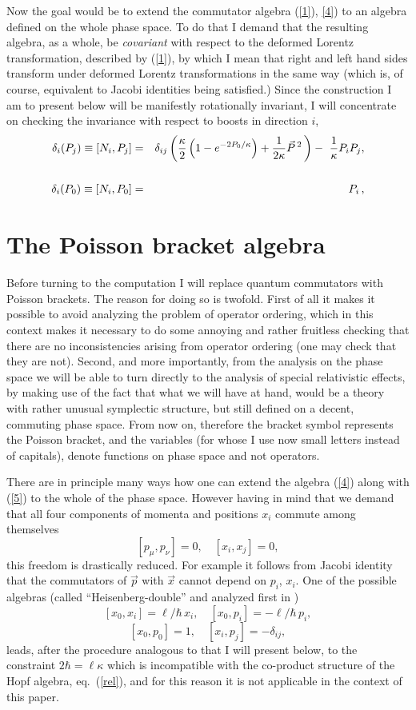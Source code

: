 \documentclass[a4paper,a4paper]{article}
\begin{document}
Now the  goal would be to extend the commutator algebra (\ref{1}), \ref{4}) to an algebra defined on the whole phase space. To do that I demand that the resulting algebra, as a whole,  be {\em covariant} with respect to the deformed Lorentz transformation, described by (\ref{1}), by which I mean that right and  left hand sides transform under deformed Lorentz transformations in the same way (which is, of course, equivalent to Jacobi identities being satisfied.) Since the construction I am to present below will be manifestly rotationally invariant, I will concentrate on checking the invariance with respect to boosts in direction $i$,
\begin{eqnarray} \label{5}
\displaystyle
\delta_i(P_j) \equiv  [N_{i}, P_{j}] = && \delta_{ij}
 \left( {\kappa\over 2} \left(
 1 -e^{-2{P_{0}/ \kappa}}
\right) + {1\over 2\kappa} \vec{P}\, ^{ 2}\, \right)
- \ {1\over \kappa} P_{i}P_{j} ,
\cr \cr
\delta_i(P_0) \equiv  \left[N_{i},P_{0}\right] = && P_{i}\, ,
\end{eqnarray}

\section{The   Poisson bracket algebra}

Before turning to the computation I will replace quantum commutators with Poisson brackets. The reason for  doing so is twofold. First of all it makes it possible to avoid analyzing the problem of operator ordering, which in this context makes it necessary to do some annoying and rather fruitless checking that there are no inconsistencies arising from operator ordering (one may check that they are not). Second, and more importantly, from the analysis on the phase space we will be able to turn directly to the analysis of special relativistic effects, by making use of the fact that what we will have at hand, would be a theory with rather unusual symplectic structure, but still defined on a decent, commuting phase space.  From now on, therefore the bracket symbol represents the Poisson bracket, and the variables (for whose I use now small letters instead of capitals), denote functions on phase space and not operators.



There are in principle many ways how one can extend the algebra (\ref{4}) along with (\ref{5}) to the whole of the phase space. However having in mind that we demand that all four components of momenta and positions $x_i$   commute among themselves
$$ [ p_\mu, p_\nu] =0, \quad [ x_i, x_j] =0, $$ this freedom is drastically reduced. For example it follows from Jacobi identity that the commutators of $\vec{p}$ with $\vec{x}$  cannot depend on $p_i$, $x_i$. One of the possible algebras (called ``Heisenberg-double'' and analyzed first in \cite{luno})
$$
  [ x_0, x_i] = \ell/\hbar \, x_i, \quad
  [ x_0, p_i] = - \ell/\hbar \, p_i,
$$ $$
  [ x_0, p_0] = 1,\quad
  [ x_i, p_j] = -\delta_{ij},$$
leads, after the procedure analogous to that I will present below, to the constraint $2\hbar =\ell\kappa$ which is incompatible with the co-product structure of the Hopf algebra, eq.~(\ref{rel}), and for this reason it is not applicable in the context of this paper.
\end{document}
